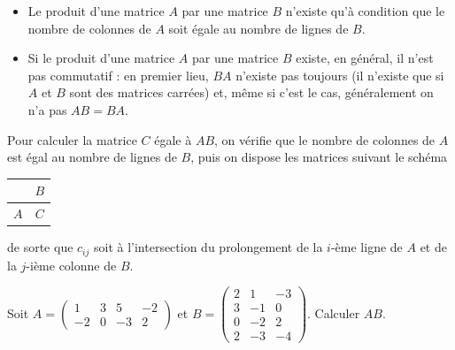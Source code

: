 \documentclass{cornouaille}
\begin{document}
\begin{remarques}
\begin{itemize}
\item Le produit d'une matrice $A$ par une matrice $B$ n'existe qu'à condition que le nombre de colonnes de $A$ soit égale au nombre de lignes de $B$.
\item Si le produit d'une matrice $A$ par une matrice $B$ existe, en général, il n'est pas commutatif : en premier lieu, $BA$ n'existe pas toujours
(il n'existe que si $A$ et $B$ sont des matrices carrées) et, même si c'est le cas, généralement on n'a pas $AB=BA$.
\end{itemize}
\end{remarques}

\begin{methode}
Pour calculer la matrice $C$ égale à $AB$, on vérifie que le nombre de colonnes de $A$ est égal au nombre de lignes de $B$, puis on dispose
les matrices suivant le schéma
\begin{tabular}{c|c}
 & $B$ \\
 \hline
$A$ & $C$
\end{tabular} de sorte que  $c_{ij}$ soit à l'intersection du prolongement de la $i$-ème ligne de $A$ et de la $j$-ième colonne de $B$.


\begin{exercice}
 Soit
 $A=\begin{pmatrix}
1 &  3 & 5 & -2 \\
-2 & 0 & -3 & 2
\end{pmatrix}$ et $B=\begin{pmatrix}
2 & 1  & -3 \\
3 &  -1 & 0 \\
0 & -2 & 2 \\
2 & -3 & -4
\end{pmatrix}$. Calculer $AB$.

\begin{solution}


\end{solution}
\end{exercice}
\end{methode}
\end{document}
